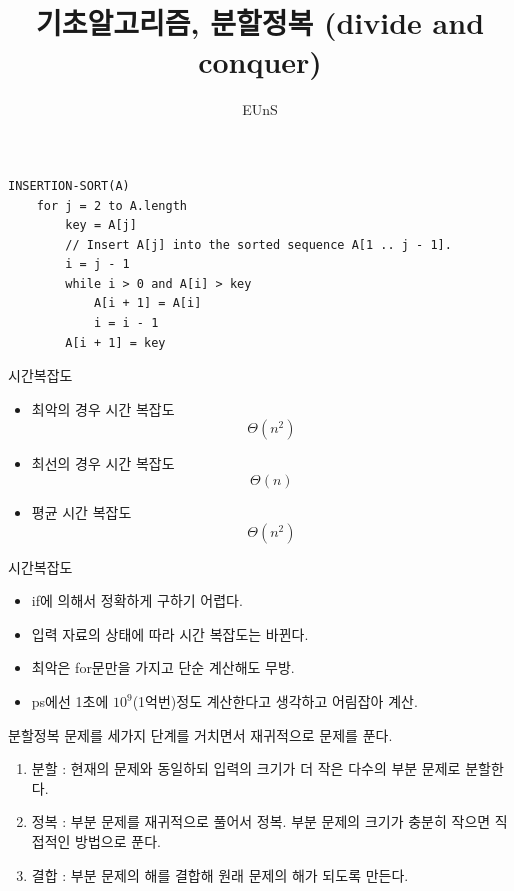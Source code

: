 \documentclass[10pt]{beamer}
\title{기초알고리즘, 분할정복 (divide and conquer)}
\author{EUnS}
\begin{document}
\begin{frame}{}
    \maketitle
\end{frame}    



\begin{frame}[fragile]{}
    \begin{lstlisting}[style = CppStyle]
    INSERTION-SORT(A)
    for j = 2 to A.length
        key = A[j]
        // Insert A[j] into the sorted sequence A[1 .. j - 1].
        i = j - 1
        while i > 0 and A[i] > key
            A[i + 1] = A[i]
            i = i - 1
        A[i + 1] = key
    \end{lstlisting}
\end{frame}


\begin{frame}{시간복잡도}
    \begin{itemize}
        \item 최악의 경우 시간 복잡도 \pause
        $$\Theta(n^2)$$
        \item 최선의 경우 시간 복잡도  \pause
        $$\Theta(n)$$
        \item 평균 시간 복잡도
        $$\Theta(n^2)$$
    \end{itemize}
\end{frame}




\begin{frame}{시간복잡도}
    \begin{itemize}
        \item if에 의해서 정확하게 구하기 어렵다. \pause
        \item 입력 자료의 상태에 따라 시간 복잡도는 바뀐다. \pause
        \item 최악은 for문만을 가지고 단순 계산해도 무방. \pause
        \item ps에선 1초에 $10^9$(1억번)정도 계산한다고 생각하고 어림잡아 계산.
    \end{itemize}
\end{frame}




\begin{frame}{분할정복}
    문제를 세가지 단계를 거치면서 재귀적으로 문제를 푼다.
    \begin{enumerate}
        \item 분할 : 현재의 문제와 동일하되 입력의 크기가 더 작은 다수의 부분 문제로 분할한다.
        \item 정복 : 부분 문제를 재귀적으로 풀어서 정복. 부분 문제의 크기가 충분히 작으면 직접적인 방법으로 푼다.
        \item 결합 : 부분 문제의 해를 결합해 원래 문제의 해가 되도록 만든다.
    \end{enumerate}
\end{frame}
\end{document}
